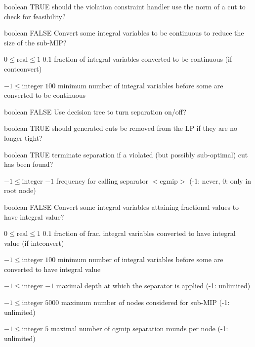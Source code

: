 %
{boolean}%
{TRUE}%
{should the violation constraint handler use the norm of a cut to check for feasibility?}%
{}

%
{boolean}%
{FALSE}%
{Convert some integral variables to be continuous to reduce the size of the sub-MIP?}%
{}

%
{$0\leq\textrm{real}\leq1$}%
{$0.1$}%
{fraction of integral variables converted to be continuous (if contconvert)}%
{}

%
{$-1\leq\textrm{integer}$}%
{$100$}%
{minimum number of integral variables before some are converted to be continuous}%
{}

%
{boolean}%
{FALSE}%
{Use decision tree to turn separation on/off?}%
{}

%
{boolean}%
{TRUE}%
{should generated cuts be removed from the LP if they are no longer tight?}%
{}

%
{boolean}%
{TRUE}%
{terminate separation if a violated (but possibly sub-optimal) cut has been found?}%
{}

%
{$-1\leq\textrm{integer}$}%
{$-1$}%
{frequency for calling separator $<$cgmip$>$ (-1: never, 0: only in root node)}%
{}

%
{boolean}%
{FALSE}%
{Convert some integral variables attaining fractional values to have integral value?}%
{}

%
{$0\leq\textrm{real}\leq1$}%
{$0.1$}%
{fraction of frac. integral variables converted to have integral value (if intconvert)}%
{}

%
{$-1\leq\textrm{integer}$}%
{$100$}%
{minimum number of integral variables before some are converted to have integral value}%
{}

%
{$-1\leq\textrm{integer}$}%
{$-1$}%
{maximal depth at which the separator is applied (-1: unlimited)}%
{}

%
{$-1\leq\textrm{integer}$}%
{$5000$}%
{maximum number of nodes considered for sub-MIP (-1: unlimited)}%
{}

%
{$-1\leq\textrm{integer}$}%
{$5$}%
{maximal number of cgmip separation rounds per node (-1: unlimited)}%
{}

